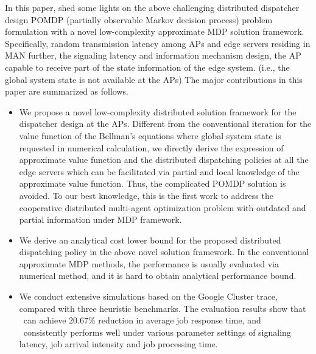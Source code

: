 In this paper, 
{
    shed some lights on the above challenging distributed dispatcher design
    POMDP (partially observable Markov decision process) problem formulation
    with a novel low-complexity approximate MDP solution framework.
}
Specifically,
{
    random transmission latency among APs and edge servers residing in MAN
    further, the signaling latency and information mechanism design, the AP capable to receive part of the state information of the edge system.
    (i.e., the global system state is not available at the APs)
}
The major contributions in this paper are summarized as follows.
\begin{itemize}
    \item We propose a novel low-complexity distributed solution framework for the dispatcher design at the APs.
    Different from the conventional iteration for the value function of the Bellman's equations where global system state is requested in numerical calculation,
    we directly derive the expression of approximate value function and the distributed dispatching policies at all the edge servers which can be facilitated via partial and local knowledge of the approximate value function.
    Thus, the complicated POMDP solution is avoided.
    To our best knowledge, this is the first work to address the cooperative distributed multi-agent optimization problem {with outdated and partial information} under MDP framework.
    \item We derive an analytical cost lower bound for the proposed distributed dispatching policy in the above novel solution framework. In the conventional approximate MDP methods, the performance is usually evaluated via numerical method, and it is hard to obtain analytical performance bound. 
    \item We conduct extensive simulations based on the Google Cluster trace, compared with three heuristic benchmarks. The evaluation results show that \algname~can achieve $20.67\%$ reduction in average job response time, and \algname~consistently performs well under various parameter settings of signaling latency, job arrival intensity and job processing time. 
\end{itemize}


